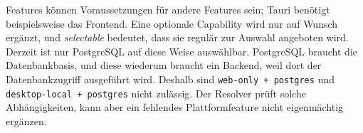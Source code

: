 \begin{beginnerstatement}

Features können Voraussetzungen für andere Features sein; Tauri benötigt
beispielsweise das Frontend. Eine optionale Capability wird nur auf Wunsch
ergänzt, und \emph{selectable} bedeutet, dass sie regulär zur Auswahl angeboten
wird. Derzeit ist nur PostgreSQL auf diese Weise auswählbar. PostgreSQL braucht
die Datenbankbasis, und diese wiederum braucht ein Backend, weil dort der
Datenbankzugriff ausgeführt wird. Deshalb sind
\texttt{web-only + postgres} und \texttt{desktop-local + postgres} nicht
zulässig. Der Resolver prüft solche Abhängigkeiten, kann aber ein fehlendes
Plattformfeature nicht eigenmächtig ergänzen.

\end{beginnerstatement}
